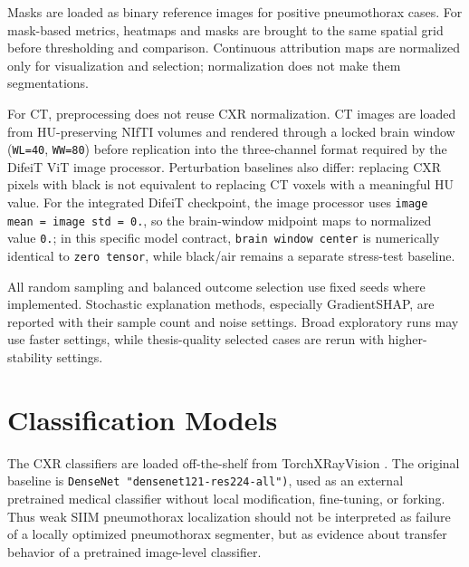 Masks are loaded as binary reference images for positive pneumothorax
cases. For mask-based metrics, heatmaps and masks are brought to the
same spatial grid before thresholding and comparison. Continuous
attribution maps are normalized only for visualization and selection;
normalization does not make them segmentations.

For CT, preprocessing does not reuse CXR normalization. CT images are
loaded from HU-preserving NIfTI volumes and rendered through a locked
brain window (\texttt{WL=40}, \texttt{WW=80}) before replication into
the three-channel format required by the DifeiT ViT image processor.
Perturbation baselines also differ: replacing CXR pixels with black is
not equivalent to replacing CT voxels with a meaningful HU value. For
the integrated DifeiT checkpoint, the image processor uses
\texttt{image \allowbreak mean\ =\ image \allowbreak std\ =\ 0.}, so the brain-window
midpoint maps to normalized value \texttt{0.}; in this specific model
contract, \texttt{brain \allowbreak window \allowbreak center} is numerically identical to
\texttt{zero \allowbreak tensor}, while black/air remains a separate stress-test
baseline.

All random sampling and balanced outcome selection use fixed seeds where
implemented. Stochastic explanation methods, especially GradientSHAP,
are reported with their sample count and noise settings. Broad
exploratory runs may use faster settings, while thesis-quality selected
cases are rerun with higher-stability settings.

\hypertarget{classification-models}{%
	\section{Classification Models}\label{classification-models}}

The CXR classifiers are loaded off-the-shelf from TorchXRayVision
\cite{ref-torchxrayvision}. The original baseline is
\texttt{DenseNet \allowbreak "densenet121-\allowbreak res224-\allowbreak all")}, used as
an external pretrained medical classifier without local modification,
fine-tuning, or forking. Thus weak SIIM
pneumothorax localization should not be interpreted as failure of a
locally optimized pneumothorax segmenter, but as evidence about transfer
behavior of a pretrained image-level classifier.

